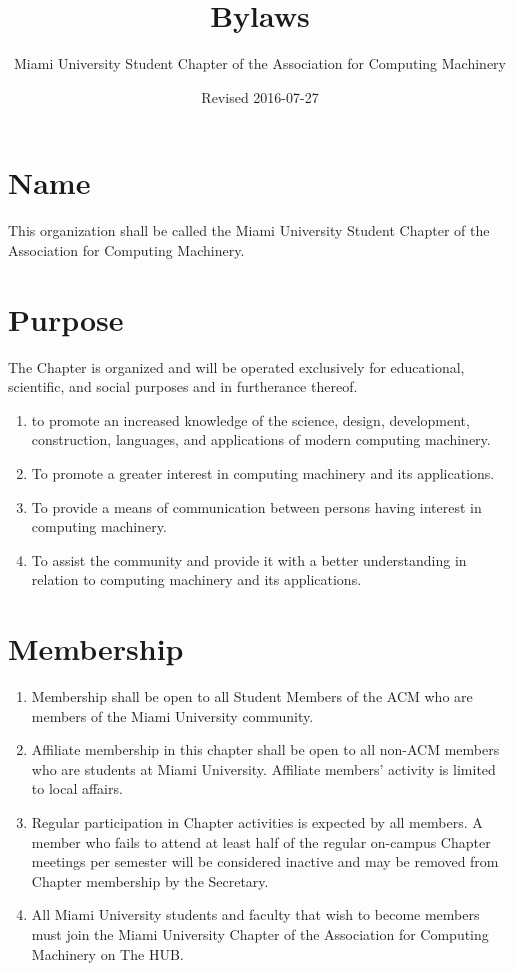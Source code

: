 \documentclass{article}
\title{Bylaws}
\author{Miami University Student Chapter of the Association for Computing Machinery}
\date{Revised 2016-07-27}
\begin{document}
\maketitle

\section{Name}
This organization shall be called the Miami University Student Chapter of the
Association for Computing Machinery.

\section{Purpose}
The Chapter is organized and will be operated exclusively for educational,
scientific, and social purposes and in furtherance thereof.

\begin{enumerate}
	\item to promote an increased knowledge of the science, design, development,
		construction, languages, and applications of modern computing machinery.

	\item To promote a greater interest in computing machinery and its applications.

	\item To provide a means of communication between persons having interest in
		computing machinery.

	\item To assist the community and provide it with a better understanding in
		relation to computing machinery and its applications.
\end{enumerate}

\section{Membership}
\begin{enumerate}
	\item Membership shall be open to all Student Members of the ACM who are members
		of the Miami University community.

	\item Affiliate membership in this chapter shall be open to all non-ACM
		members who are students at Miami University. Affiliate members'
		activity is limited to local affairs.

	\item Regular participation in Chapter activities is expected by all members. A
		member who fails to attend at least half of the regular on-campus Chapter
		meetings per semester will be considered inactive and may be removed from
		Chapter membership by the Secretary.

	\item All Miami University students and faculty that wish to become members
		must join the Miami University Chapter of the Association for Computing
		Machinery on The HUB.
\end{enumerate}
\end{document}
